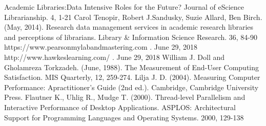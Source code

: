 \begin{thebibliography}{00}
Academic Libraries:Data Intensive Roles for the Future? Journal of eScience Librarianship. 4, 1-21
 Carol Tenopir, Robert J.Sandusky, Suzie Allard, Ben Birch. (May, 2014). 
Research data management services in academic research libraries and perceptions of librarians. 
Library \& Information Science Research. 36, 84-90
 https://www.pearsonmylabandmastering.com . June 29, 2018
 http://www.hawkeslearning.com/ . June 29, 2018
 William J. Doll and Gholamreza Torkzadeh. (June, 1988). The Measurement of 
End-User Computing Satisfaction. MIS Quarterly, 12, 259-274.
 Lilja J. D. (2004). Measuring Computer Performance: Apractitioner's Guide (2nd ed.). 
Cambridge, Cambridge University Press. 
Flautner K., Uhlig R., Mudge T. (2000). Thread-level Parallelism and Interactive
Performance of Desktop Applications. ASPLOS: Architectural Support for Programming Languages and Operating 
Systems. 2000, 129-138
\bibitem{}
\bibitem{}
\bibitem{}
\bibitem{}
\bibitem{}
\end{thebibliography}
